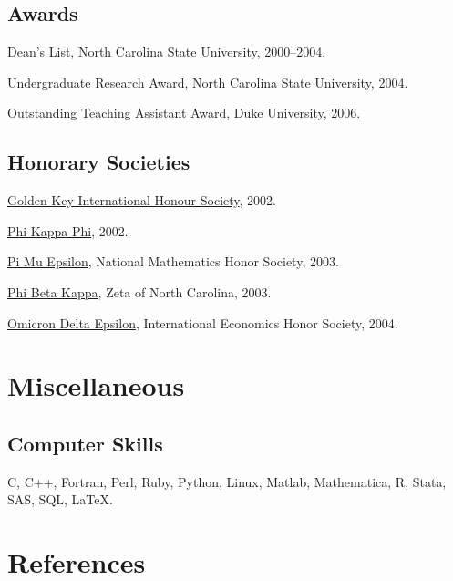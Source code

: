 \documentclass[letterpaper]{article}
\renewenvironment{itemize}{
  \begin{list}{}{
    \setlength{\leftmargin}{1em}
  }
}{
  \end{list}
}
\begin{document}
\subsection*{Awards}

\begin{itemize}
\item Dean's List, North Carolina State University, 2000--2004.
\item Undergraduate Research Award, North Carolina State University, 2004.
\item Outstanding Teaching Assistant Award, Duke University, 2006.
\end{itemize}

\subsection*{Honorary Societies}

\begin{itemize}
\item \href{http://www.goldenkey.org}{Golden Key International
    Honour Society}, 2002.
\item \href{http://www.phikappaphi.org/}{Phi Kappa Phi}, 2002.
\item \href{http://www.pme-math.org/}{Pi Mu Epsilon},
  National Mathematics Honor Society,
  2003.
\item \href{http://www.pbk.org/}{Phi Beta Kappa}, Zeta of North Carolina, 2003.
\item \href{http://www.cba.ua.edu/~ode/}{Omicron Delta Epsilon},
  International Economics Honor Society,
  2004.
\end{itemize}

\section*{Miscellaneous}

\subsection*{Computer Skills}

C, C++, Fortran, Perl, Ruby, Python, Linux,
Matlab, Mathematica, R, Stata, SAS, SQL, \LaTeX.

\section*{References}
\end{document}
